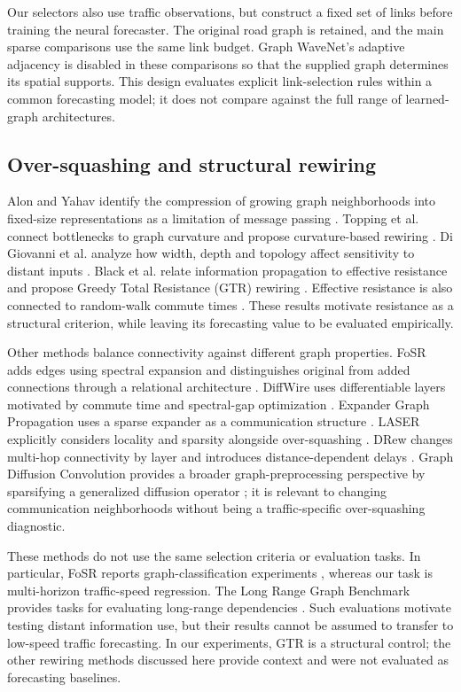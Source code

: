 Our selectors also use traffic observations, but construct a fixed set of links before training the neural forecaster. The original road graph is retained, and the main sparse comparisons use the same link budget. Graph WaveNet's adaptive adjacency is disabled in these comparisons so that the supplied graph determines its spatial supports. This design evaluates explicit link-selection rules within a common forecasting model; it does not compare against the full range of learned-graph architectures.

\subsection{Over-squashing and structural rewiring}
Alon and Yahav identify the compression of growing graph neighborhoods into fixed-size representations as a limitation of message passing \cite{alon2021bottleneck}. Topping et al. connect bottlenecks to graph curvature and propose curvature-based rewiring \cite{topping2022curvature}. Di Giovanni et al. analyze how width, depth and topology affect sensitivity to distant inputs \cite{digiovanni2023oversquashing}. Black et al. relate information propagation to effective resistance and propose Greedy Total Resistance (GTR) rewiring \cite{black2023resistance}. Effective resistance is also connected to random-walk commute times \cite{chandra1996resistance}. These results motivate resistance as a structural criterion, while leaving its forecasting value to be evaluated empirically.

Other methods balance connectivity against different graph properties. FoSR adds edges using spectral expansion and distinguishes original from added connections through a relational architecture \cite{karhadkar2023fosr}. DiffWire uses differentiable layers motivated by commute time and spectral-gap optimization \cite{arnaiz2022diffwire}. Expander Graph Propagation uses a sparse expander as a communication structure \cite{deac2022egp}. LASER explicitly considers locality and sparsity alongside over-squashing \cite{barbero2024laser}. DRew changes multi-hop connectivity by layer and introduces distance-dependent delays \cite{gutteridge2023drew}. Graph Diffusion Convolution provides a broader graph-preprocessing perspective by sparsifying a generalized diffusion operator \cite{gasteiger2019diffusion}; it is relevant to changing communication neighborhoods without being a traffic-specific over-squashing diagnostic.

These methods do not use the same selection criteria or evaluation tasks. In particular, FoSR reports graph-classification experiments \cite{karhadkar2023fosr}, whereas our task is multi-horizon traffic-speed regression. The Long Range Graph Benchmark provides tasks for evaluating long-range dependencies \cite{dwivedi2022lrgb}. Such evaluations motivate testing distant information use, but their results cannot be assumed to transfer to low-speed traffic forecasting. In our experiments, GTR is a structural control; the other rewiring methods discussed here provide context and were not evaluated as forecasting baselines.

